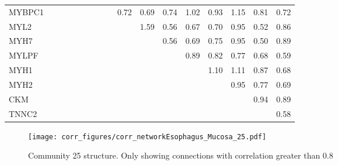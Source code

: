 \begin{longtable}{lrrrrrrrrrrrrrrrr}
MYBPC1       &           &               &            &             &                    &            &            &              &       0.72 &       0.69 &        0.74 &       1.02 &       0.93 &      1.15 &        0.81 &     0.72 \\
MYL2         &           &               &            &             &                    &            &            &              &            &       1.59 &        0.56 &       0.67 &       0.70 &      0.95 &        0.52 &     0.86 \\
MYH7         &           &               &            &             &                    &            &            &              &            &            &        0.56 &       0.69 &       0.75 &      0.95 &        0.50 &     0.89 \\
MYLPF        &           &               &            &             &                    &            &            &              &            &            &             &       0.89 &       0.82 &      0.77 &        0.68 &     0.59 \\
MYH1         &           &               &            &             &                    &            &            &              &            &            &             &            &       1.10 &      1.11 &        0.87 &     0.68 \\
MYH2         &           &               &            &             &                    &            &            &              &            &            &             &            &            &      0.95 &        0.77 &     0.69 \\
CKM          &           &               &            &             &                    &            &            &              &            &            &             &            &            &           &        0.94 &     0.89 \\
TNNC2        &           &               &            &             &                    &            &            &              &            &            &             &            &            &           &             &     0.58 \\
\end{longtable}


\begin{figure}[h!]
\centering
\texttt{[image: corr\_figures/corr\_networkEsophagus\_Mucosa\_25.pdf]}
\caption{Community 25 structure. Only showing connections with correlation greater than 0.8}
\end{figure}


